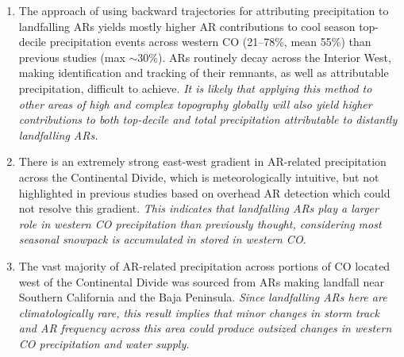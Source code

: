 \documentclass[draft]{agujournal2019}
\begin{document}
\begin{enumerate}
  \item The approach of using backward trajectories for attributing precipitation to landfalling ARs yields mostly higher AR contributions to cool season top-decile precipitation events across western CO (21--78\%, mean 55\%) than previous studies (max $\sim$30\%). ARs routinely decay across the Interior West, making identification and tracking of their remnants, as well as attributable precipitation, difficult to achieve. \textit{It is likely that applying this method to other areas of high and complex topography globally will also yield higher contributions to both top-decile and total precipitation attributable to distantly landfalling ARs.}

  \item There is an extremely strong east-west gradient in AR-related precipitation across the Continental Divide, which is meteorologically intuitive, but not highlighted in previous studies based on overhead AR detection which could not resolve this gradient. \textit{This indicates that landfalling ARs play a larger role in western CO precipitation than previously thought, considering most seasonal snowpack is accumulated in stored in western CO.}
  
  \item The vast majority of AR-related precipitation across portions of CO located west of the Continental Divide was sourced from ARs making landfall near Southern California and the Baja Peninsula. \textit{Since landfalling ARs here are climatologically rare, this result implies that minor changes in storm track and AR frequency across this area could produce outsized changes in western CO precipitation and water supply.}
  
\end{enumerate}
\end{document}
